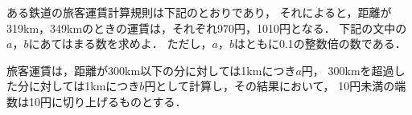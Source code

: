 \documentclass[../../main.tex]{subfiles}
\begin{document}
ある鉄道の旅客運賃計算規則は下記のとおりであり，
それによると，距離が319km，349kmのときの運賃は，それぞれ970円，1010円となる．
下記の文中の$a$，$b$にあてはまる数を求めよ．
ただし，$a$，$b$はともに0.1の整数倍の数である．

旅客運賃は，距離が300km以下の分に対しては1kmにつき$a$円，
300kmを超過した分に対しては1kmにつき$b$円として計算し，その結果において，
10円未満の端数は10円に切り上げるものとする．
\end{document}
